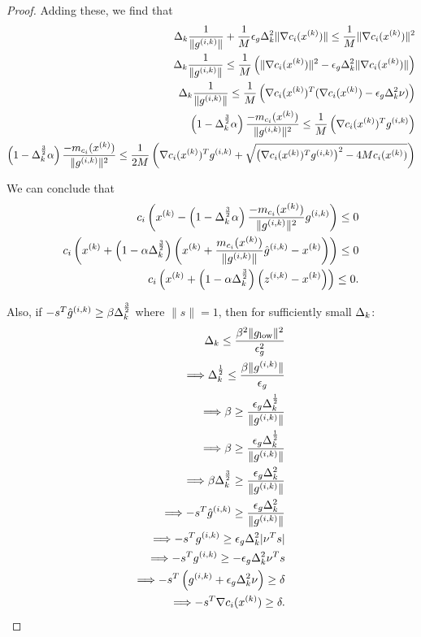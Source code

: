 \begin{proof}
Adding these, we find that
\begin{align*}
\Delta_k \frac{1}{\|{g^{(i, k)}}\|} + \frac{1}{M}\epsilon_g \Delta_k^2\|\nabla c_i({x^{(k)}})\| \le \frac{1}{M}\|\nabla c_i({x^{(k)}})\|^2 \\
\Delta_k \frac{1}{\|{g^{(i, k)}}\|} \le \frac{1}{M}\left(\|\nabla c_i({x^{(k)}})\|^2 - \epsilon_g \Delta_k^2\|\nabla c_i({x^{(k)}})\|\right) \\
\Delta_k \frac{1}{\|{g^{(i, k)}}\|} \le \frac{1}{M}\left(\nabla c_i({x^{(k)}})^T(\nabla c_i({x^{(k)}}) - \epsilon_g \Delta_k^2 \nu)\right) \\
\left(1 - \Delta_k^{\frac 3 2 }\alpha\right)\frac{-m_{c_i}({x^{(k)}})}{\|{g^{(i, k)}}\|^2} \le \frac{1}{M}\left(\nabla c_i({x^{(k)}})^T{g^{(i, k)}}\right) \\
\left(1 - \Delta_k^{\frac 3 2 }\alpha\right)\frac{-m_{c_i}({x^{(k)}})}{\|{g^{(i, k)}}\|^2} \le \frac{1}{2M}\left(\nabla c_i({x^{(k)}})^T{g^{(i, k)}} + \sqrt{\left(\nabla c_i({x^{(k)}})^T{g^{(i, k)}}\right)^2 - 4 M c_i({x^{(k)}})} \right) \\
\end{align*}


We can conclude that
\begin{align*}
c_i\left({x^{(k)}} -\left(1 - \Delta_k^{\frac 3 2 }\alpha\right)\frac{-m_{c_i}({x^{(k)}})}{\|{g^{(i, k)}}\|^2}{g^{(i, k)}}\right) \le 0 \\
c_i\left({x^{(k)}} + \left(1 - \alpha\Delta_k^{\frac 3 2}\right)\left({x^{(k)}} + \frac{m_{c_i}({x^{(k)}})}{\|{g^{(i, k)}}\|}{{\hat g}^{(i, k)}} - {x^{(k)}}\right)\right) \le 0 \\
c_i\left({x^{(k)}} + \left(1 - \alpha\Delta_k^{\frac 3 2}\right)\left({z^{(i, k)}} - {x^{(k)}}\right)\right) \le 0.
\end{align*}



Also, if $-s^T {{\hat g}^{(i, k)}} \ge \beta \Delta_k^{\frac 3 2}$ where $\|s\| = 1$, then for sufficiently small $\Delta_k$:
\begin{align*}
\Delta_k \le \frac{\beta^2\|g_{\text{low}}\|^2}{\epsilon_g^2}  \\
\Longrightarrow \Delta_k^{\frac 1 2 } \le \frac{\beta\|{g^{(i, k)}}\|}{\epsilon_g} \\
\Longrightarrow \beta \ge \frac{\epsilon_{g}\Delta_k^{\frac 1 2}}{\|{g^{(i, k)}}\|} \\
\Longrightarrow \beta \ge \frac{\epsilon_{g}\Delta_k^{\frac 1 2}}{\|{g^{(i, k)}}\|} \\
\Longrightarrow \beta\Delta_k^{\frac 3 2} \ge \frac{\epsilon_{g}\Delta_k^2}{\|{g^{(i, k)}}\|} \\
\Longrightarrow -s^T{{\hat g}^{(i, k)}} \ge \frac{\epsilon_{g}\Delta_k^2}{\|{g^{(i, k)}}\|}  \\
\Longrightarrow -s^T{g^{(i, k)}} \ge \epsilon_{g}\Delta_k^2|\nu^T s| \\
\Longrightarrow -s^T{g^{(i, k)}} \ge -\epsilon_{g}\Delta_k^2\nu^T s \\
\Longrightarrow -s^T\left({g^{(i, k)}} + \epsilon_{g}\Delta_k^2\nu\right) \ge \delta \\
\Longrightarrow -s^T\nabla c_i({x^{(k)}}) \ge \delta.
\end{align*}




\end{proof}
